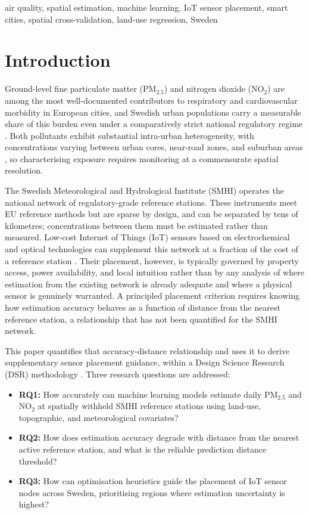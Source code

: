\documentclass[conference]{IEEEtran}
\begin{document}
\begin{IEEEkeywords}
air quality, spatial estimation, machine learning, IoT sensor placement,
smart cities, spatial cross-validation, land-use regression, Sweden
\end{IEEEkeywords}

\section{Introduction}
\label{sec:intro}

Ground-level fine particulate matter (PM$_{2.5}$) and nitrogen dioxide
(NO$_2$) are among the most well-documented contributors to respiratory and
cardiovascular morbidity in European cities, and Swedish urban populations
carry a measurable share of this burden even under a comparatively strict
national regulatory regime \cite{segersson_sweden_health_2017}. Both
pollutants exhibit substantial intra-urban heterogeneity, with concentrations
varying between urban cores, near-road zones, and suburban areas
\cite{sweden_dispersion_2024}, so characterising exposure requires monitoring
at a commensurate spatial resolution.

The Swedish Meteorological and Hydrological Institute (SMHI) operates the
national network of regulatory-grade reference stations. These instruments
meet EU reference methods but are sparse by design, and can be separated by
tens of kilometres; concentrations between them must be estimated rather than
measured. Low-cost Internet of Things (IoT) sensors based on electrochemical
and optical technologies can supplement this network at a fraction of the cost
of a reference station \cite{karinthi_sustainable_aqm_2022, popescu_iot_aq_2024}.
Their placement, however, is typically governed by
property access, power availability, and local intuition rather than by any
analysis of where estimation from the existing network is already adequate and
where a physical sensor is genuinely warranted. A principled placement
criterion requires knowing how estimation accuracy behaves as a function of
distance from the nearest reference station, a relationship that has not been
quantified for the SMHI network.

This paper quantifies that accuracy-distance relationship and uses it to
derive supplementary sensor placement guidance, within a Design Science
Research (DSR) methodology \cite{peffers_dsr_2007,
hevner_design_science_2004}. Three research questions are addressed:

\begin{itemize}
\item \textbf{RQ1:} How accurately can machine learning models estimate daily
PM$_{2.5}$ and NO$_2$ at spatially withheld SMHI reference stations using
land-use, topographic, and meteorological covariates?
\item \textbf{RQ2:} How does estimation accuracy degrade with distance from the
nearest active reference station, and what is the reliable prediction distance
threshold?
\item \textbf{RQ3:} How can optimisation heuristics guide the placement of IoT
sensor nodes across Sweden, prioritising regions where estimation uncertainty
is highest?
\end{itemize}
\end{document}
